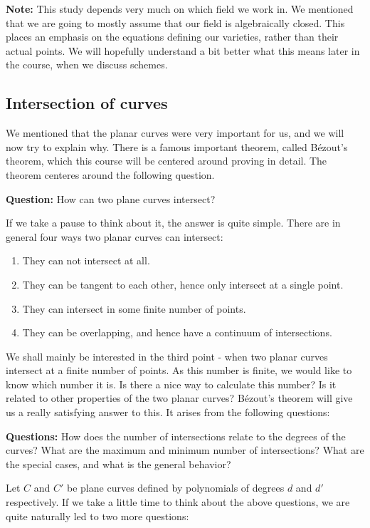 \textbf{Note: } This study depends very much on which field we work in. We mentioned that we are going to mostly assume that our field is algebraically closed. This places an emphasis on the equations defining our varieties, rather than their actual points. We will hopefully understand a bit better what this means later in the course, when we discuss schemes. 

\subsection{Intersection of curves}

We mentioned that the planar curves were very important for us, and we will now try to explain why. There is a famous important theorem, called Bézout's theorem, which this course will be centered around proving in detail. The theorem centeres around the following question.

\textbf{Question:} How can two plane curves intersect?

If we take a pause to think about it, the answer is quite simple. There are in general four ways two planar curves can intersect:
\begin{enumerate}
    \item They can not intersect at all. 
    \item They can be tangent to each other, hence only intersect at a single point. 
    \item They can intersect in some finite number of points.
    \item They can be overlapping, and hence have a continuum of intersections.
\end{enumerate}

We shall mainly be interested in the third point - when two planar curves intersect at a finite number of points. As this number is finite, we would like to know which number it is. Is there a nice way to calculate this number? Is it related to other properties of the two planar curves? Bézout's theorem will give us a really satisfying answer to this. It arises from the following questions:

\textbf{Questions:} How does the number of intersections relate to the degrees of the curves? What are the maximum and minimum number of intersections? What are the special cases, and what is the general behavior?

Let $C$ and $C'$ be plane curves defined by polynomials of degrees $d$ and $d'$  respectively. If we take a little time to think about the above questions, we are quite naturally led to two more questions:

